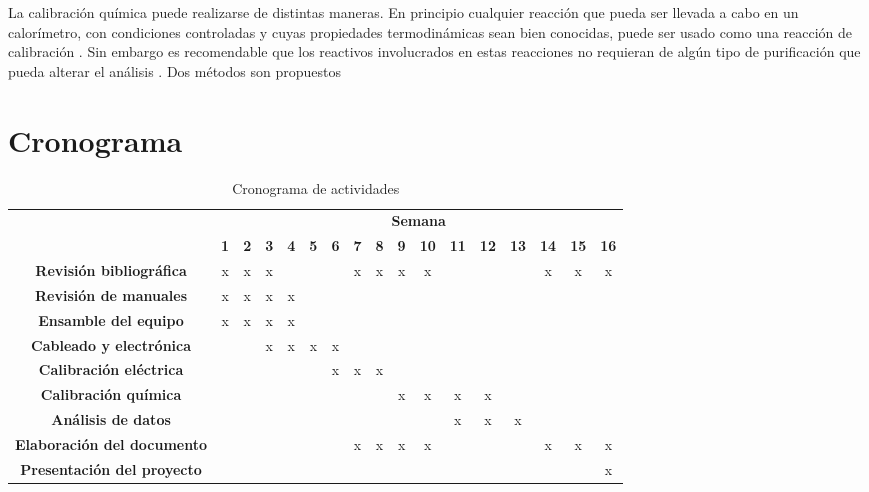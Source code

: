 	La calibración química puede realizarse de distintas maneras. En principio cualquier reacción que pueda ser llevada a cabo en un calorímetro, con condiciones controladas y cuyas propiedades termodinámicas sean bien conocidas, puede ser usado como una reacción de calibración \cite{wadso2001standards}. Sin embargo es recomendable que los reactivos involucrados en estas reacciones no requieran de algún tipo de purificación que pueda alterar el análisis \cite{wadso2001standards}. Dos métodos son propuestos
	

\section{Cronograma}
	\begin{table}[h]
		\centering
		\caption{Cronograma de actividades}
		\label{tb: cronograma}
		\footnotesize
		\begin{tabular}{|c|c|c|c|c|c|c|c|c|c|c|c|c|c|c|c|c|}
			\hline
			\rowcolor[HTML]{C0C0C0} 
			\cellcolor[HTML]{C0C0C0}                                       & \multicolumn{16}{c|}{\cellcolor[HTML]{C0C0C0}\textbf{Semana}} \\ \cline{2-17} 
			\rowcolor[HTML]{EFEFEF} 
			\multirow{-2}{*}{\cellcolor[HTML]{C0C0C0}\textbf{Actividades}} & \textbf{1} & \textbf{2} & \textbf{3} & \textbf{4} & \textbf{5} & \textbf{6} & \textbf{7} & \textbf{8} & \textbf{9} & \textbf{10} & \textbf{11} & \textbf{12} & \textbf{13} & \textbf{14} & \textbf{15} & \textbf{16} \\ \hline
			\cellcolor[HTML]{EFEFEF}
			\textbf{Revisión bibliográfica} & x & x & x & & & & x & x & x & x & & & & x & x & x \\ \hline
			\cellcolor[HTML]{EFEFEF}\textbf{Revisión de manuales} & x & x & x & x & & & & & & & & & & & & \\ \hline
			\cellcolor[HTML]{EFEFEF}\textbf{Ensamble del equipo} & x & x & x & x & & & & & & & & & & & & \\ \hline
			\cellcolor[HTML]{EFEFEF}\textbf{Cableado y electrónica} & & & x & x & x & x & & & & & & & & & & \\ \hline
			\cellcolor[HTML]{EFEFEF}\textbf{Calibración eléctrica} & & & & & & x & x & x & & & & & & & & \\ \hline
			\cellcolor[HTML]{EFEFEF}\textbf{Calibración química} & & & & & & & & & x & x & x & x & & & & \\ \hline
			\cellcolor[HTML]{EFEFEF}\textbf{Análisis de datos} & & & & & & & & & & & x & x & x & & & \\ \hline
			\cellcolor[HTML]{EFEFEF}\textbf{Elaboración del documento} & & & & & & & x & x & x & x & & & & x & x & x \\ \hline
			\cellcolor[HTML]{EFEFEF}\textbf{Presentación del proyecto} & & & & & & & & & & & & & & & & x \\ \hline
		\end{tabular}
	\end{table}

